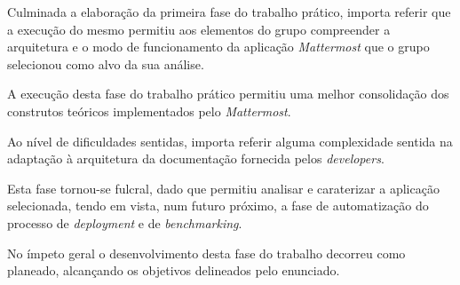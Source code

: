 Culminada a elaboração da primeira fase do trabalho prático, importa referir que a execução do mesmo permitiu aos elementos do grupo compreender a arquitetura e o modo de funcionamento da aplicação \textit{Mattermost} que o grupo selecionou como alvo da sua análise.
\par
A execução desta fase do trabalho prático permitiu uma melhor consolidação dos construtos teóricos implementados pelo \textit{Mattermost}.
\par
Ao nível de dificuldades sentidas, importa referir alguma complexidade sentida  na adaptação à arquitetura da documentação fornecida pelos \textit{developers}.
\par
Esta fase tornou-se fulcral, dado que permitiu analisar e caraterizar a aplicação selecionada, tendo em vista, num futuro próximo, a fase de automatização do processo de \textit{deployment} e de \textit{benchmarking}.
\par
No ímpeto geral o desenvolvimento desta fase do trabalho decorreu como planeado, alcançando os objetivos delineados pelo enunciado.
\par